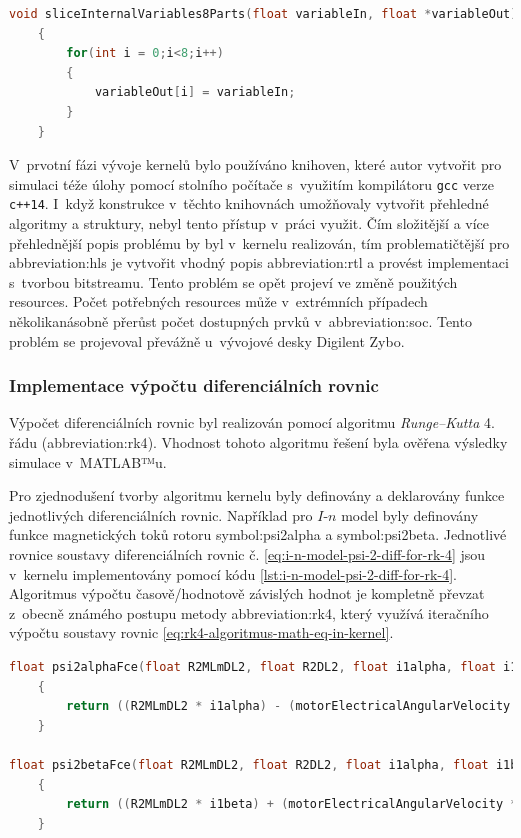 \documentclass[a4paper, twoside, 11pt]{article}
\begin{document}
		\begin{lstlisting}[language={c++}, caption={Slice funkce pro kopírování proměnné variableIn do pole variableOut s~osmi polohami.}, label={lst:slice-function-8-parts}]
void sliceInternalVariables8Parts(float variableIn, float *variableOut)
	{
		for(int i = 0;i<8;i++)
		{
			variableOut[i] = variableIn;
		}
	}\end{lstlisting}
	V~prvotní fázi vývoje kernelů bylo používáno knihoven, které autor vytvořit pro simulaci téže úlohy pomocí stolního počítače s~využitím kompilátoru \texttt{gcc} verze \texttt{c++14}. I~když konstrukce v~těchto knihovnách umožňovaly vytvořit přehledné algoritmy a struktury, nebyl tento přístup v~práci využit. Čím složitější a více přehlednější popis problému by byl v~kernelu realizován, tím problematičtější pro \gls{abbreviation:hls} je vytvořit vhodný popis \gls{abbreviation:rtl} a provést implementaci s~tvorbou bitstreamu. Tento problém se opět projeví ve změně použitých resources. Počet potřebných resources může v~extrémních případech několikanásobně přerůst počet dostupných prvků v~\gls{abbreviation:soc}. Tento problém se projevoval převážně u~vývojové desky Digilent Zybo.\par

			\subsubsection{Implementace výpočtu diferenciálních rovnic}\label{subsubsec:implementace-vypoctu-diferencialnich-rovnic}
		Výpočet diferenciálních rovnic byl realizován pomocí algoritmu \textit{Runge–Kutta} 4. řádu (\gls{abbreviation:rk4}). Vhodnost tohoto algoritmu řešení byla ověřena výsledky simulace v~MATLAB™u.\par
		Pro zjednodušení tvorby algoritmu kernelu byly definovány a deklarovány funkce jednotlivých diferenciálních rovnic. Například pro $I$-$n$ model byly definovány funkce magnetických toků rotoru \gls{symbol:psi2alpha} a \gls{symbol:psi2beta}. Jednotlivé rovnice soustavy diferenciálních rovnic č. \ref{eq:i-n-model-psi-2-diff-for-rk-4} jsou v~kernelu implementovány pomocí kódu \ref{lst:i-n-model-psi-2-diff-for-rk-4}. Algoritmus výpočtu časově/hodnotově závislých hodnot je kompletně převzat z~obecně známého postupu metody \gls{abbreviation:rk4}, který využívá iteračního výpočtu soustavy rovnic \ref{eq:rk4-algoritmus-math-eq-in-kernel}.

		\begin{lstlisting}[language={c++}, caption={Implementace diferenciálních rovnic č. \ref{eq:i-n-model-psi-2-diff-for-rk-4} do algoritmu kernelu.}, label={lst:i-n-model-psi-2-diff-for-rk-4}]
float psi2alphaFce(float R2MLmDL2, float R2DL2, float i1alpha, float i1beta, float psi2alpha, float psi2beta, float motorElectricalAngularVelocity)
	{
		return ((R2MLmDL2 * i1alpha) - (motorElectricalAngularVelocity * psi2beta) - (R2DL2 * psi2alpha));
	}

float psi2betaFce(float R2MLmDL2, float R2DL2, float i1alpha, float i1beta, float psi2alpha, float psi2beta, float motorElectricalAngularVelocity)
    {
        return ((R2MLmDL2 * i1beta) + (motorElectricalAngularVelocity * psi2alpha) - (R2DL2 * psi2beta));
    }\end{lstlisting}
\end{document}
